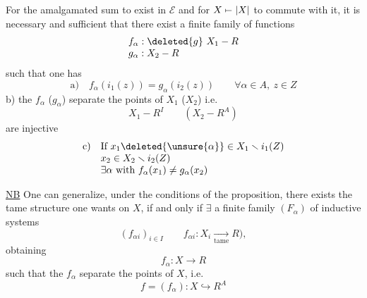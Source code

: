 For the amalgamated sum to exist in  $\mathcal E$ and for $X\mathrel{\mapstochar\relbar}|X|$ to commute with it, it is necessary and sufficient that there exist a finite family of  functions
\[
\begin{array}{l}
f_\alpha:\deleted{g}\ X_1\mathbin{-}R\\
g_\alpha:X_2\mathbin{-}R
\end{array}
\]
such that one has
\[
\text{a)}\quad f_\alpha(i_1(z))=g_\alpha(i_2(z))\qquad\forall\alpha\in A,\ z\in Z
\]
b)  the $f_\alpha$ ($g_\alpha$) separate the points of $X_1$ ($X_2$) i.e.
\[
 X_1\mathbin{-}R^I\qquad(X_2\mathbin{-}R^A)
\]
are injective
\[
\begin{array}{ll}
\text{c)}&\text{If }x_1\deleted{\unsure{\alpha}}\in X_1\smallsetminus i_1(Z)\\
&x_2\in X_2\smallsetminus i_2(Z)\\
&\exists\alpha\text{ with }f_\alpha(x_1)\ne g_\alpha(x_2)
\end{array}
\]

\uline{NB} One can generalize, under the conditions of the proposition, there exists the tame structure one wants on $X$, if and only if $\exists$ a finite family $(F_\alpha)$  of inductive systems
\[
 (f_{\alpha i})_{i\in I}\qquad f_{\alpha i}:X_i\underset{\text{tame}}{\longrightarrow}R),
\]
obtaining
\[
 f_\alpha:X\longrightarrow R
\]
such that the $f_\alpha$ separate the points of $X$, i.e.
\[
 f=(f_\alpha):X\hookrightarrow R^A
\]
